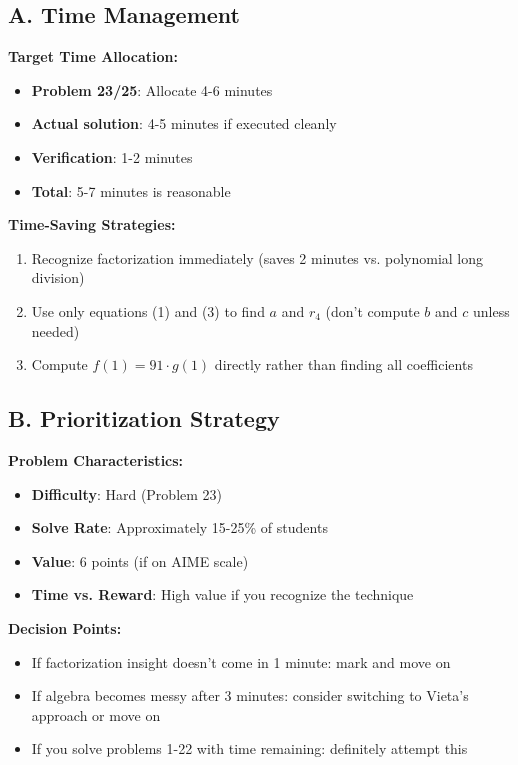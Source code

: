 \documentclass[]{article}
\begin{document}
\begin{competitionbox}
\subsection*{A. Time Management}

\textbf{Target Time Allocation:}
\begin{itemize}[leftmargin=*]
    \item \textbf{Problem 23/25}: Allocate 4-6 minutes
    \item \textbf{Actual solution}: 4-5 minutes if executed cleanly
    \item \textbf{Verification}: 1-2 minutes
    \item \textbf{Total}: 5-7 minutes is reasonable
\end{itemize}

\textbf{Time-Saving Strategies:}
\begin{enumerate}[leftmargin=*]
    \item Recognize factorization immediately (saves 2 minutes vs. polynomial long division)
    \item Use only equations (1) and (3) to find $a$ and $r_4$ (don't compute $b$ and $c$ unless needed)
    \item Compute $f(1) = 91 \cdot g(1)$ directly rather than finding all coefficients
\end{enumerate}

\subsection*{B. Prioritization Strategy}

\textbf{Problem Characteristics:}
\begin{itemize}[leftmargin=*]
    \item \textbf{Difficulty}: Hard (Problem 23)
    \item \textbf{Solve Rate}: Approximately 15-25\% of students
    \item \textbf{Value}: 6 points (if on AIME scale)
    \item \textbf{Time vs. Reward}: High value if you recognize the technique
\end{itemize}

\textbf{Decision Points:}
\begin{itemize}[leftmargin=*]
    \item If factorization insight doesn't come in 1 minute: mark and move on
    \item If algebra becomes messy after 3 minutes: consider switching to Vieta's approach or move on
    \item If you solve problems 1-22 with time remaining: definitely attempt this
\end{itemize}


\end{competitionbox}
\end{document}
